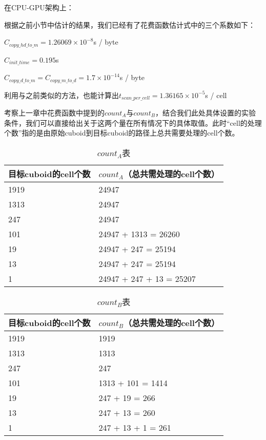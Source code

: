 在CPU-GPU架构上：

根据之前小节中估计的结果，我们已经有了花费函数估计式中的三个系数如下：

$C_{copy\_hd\_to\_m} = 1.26069 \times 10^{-8}$s / byte

$C_{init\_time} = 0.195$s

$C_{copy\_d\_to\_m} = C_{copy\_m\_to\_d} = 1.7 \times 10^{-14}$s / byte

利用与之前类似的方法，也能计算出$t_{scan\_per\_cell} = 1.36165 \times 10^{-5}$s / cell

考察上一章中花费函数中提到的$count_A$与$count_B$，结合我们此处具体设置的实验条件，我们可以直接给出关于这两个量在所有情况下的具体取值。此时“cell的处理个数”指的是由原始cuboid到目标cuboid的路径上总共需要处理的cell个数。

\begin{table}[!htbp]
\centering
\caption{$count_A$表} 
\label{tab:table11}
\begin{tabular}{|l|l|}
    \hline
    目标cuboid的cell个数 & $count_A$（总共需处理的cell个数）\\
    \hline
    1919 & 24947\\
    \hline
    1313 & 24947\\
    \hline
    247 & 24947\\
    \hline
    101 & 24947 + 1313 = 26260\\
    \hline
    19 & 24947 + 247 = 25194\\
    \hline
    13 & 24947 + 247 = 25194\\
    \hline
    1 & 24947 + 247 + 13 = 25207\\
    \hline
\end{tabular}
\end{table}

\begin{table}[!htbp]
\centering
\caption{$count_B$表} 
\label{tab:table12}
\begin{tabular}{|l|l|}
    \hline
    目标cuboid的cell个数 & $count_B$（总共需处理的cell个数）\\
    \hline
    1919 & 1919\\
    \hline
    1313 & 1313\\
    \hline
    247 & 247\\
    \hline
    101 & 1313 + 101 = 1414\\
    \hline
    19 & 247 + 19 = 266\\
    \hline
    13 & 247 + 13 = 260\\
    \hline
    1 & 247 + 13 + 1 = 261\\
    \hline
\end{tabular}
\end{table}

